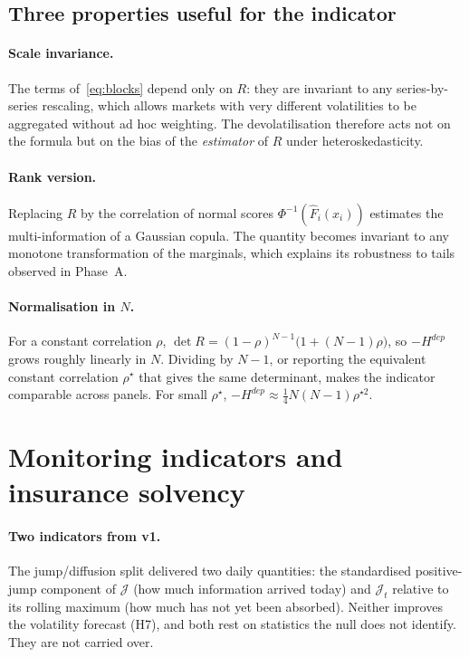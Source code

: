 \documentclass[11pt]{article}
\theoremstyle{definition}
\theoremstyle{remark}
\newcommand{\JJ}{\mathcal{J}}
\begin{document}
\subsection{Three properties useful for the indicator}

\paragraph{Scale invariance.} The terms of~\eqref{eq:blocks} depend only on
$R$: they are invariant to any series-by-series rescaling, which allows markets
with very different volatilities to be aggregated without ad hoc weighting. The
\citet{forbes2002} devolatilisation therefore acts not on the formula but on the
bias of the \emph{estimator} of $R$ under heteroskedasticity.

\paragraph{Rank version.} Replacing $R$ by the correlation of normal scores
$\Phi^{-1}(\hat F_i(x_i))$ estimates the multi-information of a Gaussian copula.
The quantity becomes invariant to any monotone transformation of the marginals,
which explains its robustness to tails observed in Phase~A.

\paragraph{Normalisation in $N$.} For a constant correlation $\rho$,
$\det R=(1-\rho)^{N-1}\big(1+(N-1)\rho\big)$, so $-H^{dep}$ grows roughly linearly
in $N$. Dividing by $N-1$, or reporting the equivalent constant correlation
$\rho^\star$ that gives the same determinant, makes the indicator comparable
across panels. For small $\rho^\star$,
$-H^{dep}\approx\tfrac14N(N-1)\rho^{\star2}$.

\section{Monitoring indicators and insurance solvency}
\label{sec:monitoring}

\paragraph{Two indicators from v1.} The jump/diffusion split delivered two daily
quantities: the standardised positive-jump component of $\JJ$ (how much
information arrived today) and $\JJ_t$ relative to its rolling maximum (how much
has not yet been absorbed). Neither improves the volatility forecast (H7), and
both rest on statistics the null does not identify. They are not carried over.
\end{document}
